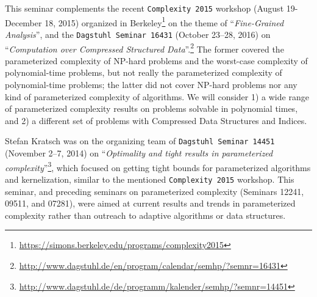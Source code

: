 \documentclass[a4paper,10pt]{article}
\begin{document}
This seminar complements the recent \texttt{Complexity 2015} workshop (August 19- December 18, 2015) organized in Berkeley\footnote{\url{https://simons.berkeley.edu/programs/complexity2015}} on the theme of ``\emph{Fine-Grained Analysis}'', and the \texttt{Dagstuhl Seminar 16431} (October 23--28, 2016) on ``\emph{Computation over Compressed Structured Data}''.\footnote{\url{http://www.dagstuhl.de/en/program/calendar/semhp/?semnr=16431}} The former covered the parameterized complexity of NP-hard problems and the worst-case complexity of polynomial-time problems, but not really the parameterized complexity of polynomial-time problems; the latter did not cover NP-hard problems nor any kind of parameterized complexity of algorithms.  We will consider 1) a wide range of parameterized complexity results on problems solvable in polynomial times, and 2) a different set of problems with Compressed Data Structures and Indices.

Stefan Kratsch was on the organizing team of \texttt{Dagstuhl Seminar 14451} (November 2--7, 2014) on ``\emph{Optimality and tight results in parameterized complexity}''\footnote{\url{http://www.dagstuhl.de/de/programm/kalender/semhp/?semnr=14451}}, which focused on getting tight bounds for parameterized algorithms and kernelization, similar to the mentioned \texttt{Complexity 2015} workshop. This seminar, and preceding seminars on parameterized complexity (Seminars 12241, 09511, and 07281), were aimed at current results and trends in parameterized complexity rather than outreach to adaptive algorithms or data structures.

\end{document}
